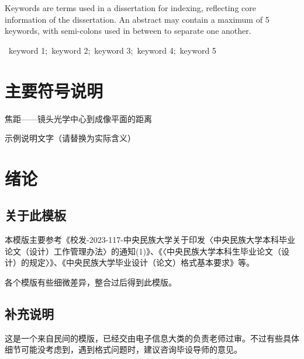 \documentclass[12pt,a4paper]{ctexart}
\begin{document}
\noindent\hspace{2em}Keywords are terms used in a dissertation for indexing, reflecting core information of the dissertation. An abstract may contain a maximum of 5 keywords, with semi-colons used in between to separate one another.

\vspace{1em}
~keyword 1;~keyword 2;~keyword 3;~keyword 4;~keyword 5

\fontfamily{\familydefault}\selectfont 

\newpage
\setcounter{page}{4}
\enlargethispage{\baselineskip}
\vspace*{-\topskip}
\tableofcontents
\thispagestyle{fancy}

\newpage
\listoffigures
\thispagestyle{fancy}

\newpage
\listoftables
\thispagestyle{fancy}

\newpage
\section*{主要符号说明}
\thispagestyle{fancy}
\begin{description}[leftmargin=4em,itemsep=0.5\baselineskip]
    \item[$f$] 焦距——镜头光学中心到成像平面的距离
    \item[$\delta$] 示例说明文字（请替换为实际含义）
\end{description}

\newpage
\setcounter{page}{1}
\section{绪论}
\subsection{关于此模板}
本模版主要参考《校发-2023-117-中央民族大学关于印发〈中央民族大学本科毕业论文（设计）工作管理办法〉的通知(1)》、《〈中央民族大学本科生毕业论文（设计）的规定〉》、《中央民族大学毕业设计（论文）格式基本要求》等。

各个模版有些细微差异，整合过后得到此模版。

\subsection{补充说明}
这是一个来自民间的模版，已经交由电子信息大类的负责老师过审。不过有些具体细节可能没考虑到，遇到格式问题时，建议咨询毕设导师的意见。
\end{document}
